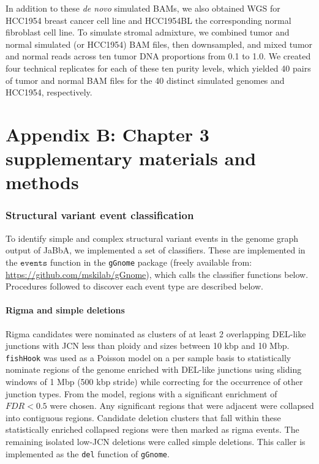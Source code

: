\documentclass[phd,tocprelim]{cornell}
\newcommand{\ttt}[1]{\texttt{#1}}
\begin{document}
In addition to these \textit{de novo} simulated BAMs, we also obtained WGS for HCC1954 breast cancer cell line and HCC1954BL the corresponding normal fibroblast cell line.  To simulate stromal admixture, we combined tumor and normal simulated (or HCC1954) BAM files, then downsampled, and mixed tumor and normal reads across ten tumor DNA proportions from 0.1 to 1.0. We created four technical replicates for each of these ten purity levels, which yielded 40 pairs of tumor and normal BAM files for the 40 distinct simulated genomes and HCC1954, respectively.

\chapter*{Appendix B: Chapter 3 supplementary materials and methods} \label{app:b}

\subsection*{Structural variant event classification}
To identify simple and complex structural variant events in the genome graph output of JaBbA, we implemented a set of classifiers.  These are implemented in the $\ttt{events}$ function in the \texttt{gGnome} package (freely available from: \url{https://github.com/mskilab/gGnome}), which calls the classifier functions below. Procedures followed to discover each event type are described below.

\subsubsection*{Rigma and simple deletions}
Rigma candidates were nominated as clusters of at least 2 overlapping DEL-like junctions with JCN less than ploidy and sizes between 10 kbp and 10 Mbp. \texttt{fishHook} was used as a Poisson model on a per sample basis to statistically nominate regions of the genome enriched with DEL-like junctions using sliding windows of 1 Mbp (500 kbp stride) while correcting for the occurrence of other junction types. From the model, regions with a significant enrichment of $FDR < 0.5$ were chosen. Any significant regions that were adjacent were collapsed into contiguous regions. Candidate deletion clusters that fall within these statistically enriched collapsed regions were then marked as rigma events. The remaining isolated low-JCN deletions were called simple deletions.  This caller is implemented as the \ttt{del} function of \ttt{gGnome}.
\end{document}
